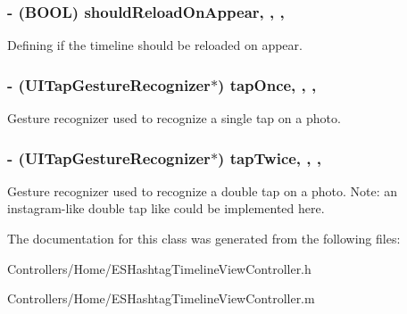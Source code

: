 \subsubsection[{should\+Reload\+On\+Appear}]{\setlength{\rightskip}{0pt plus 5cm}-\/ (B\+O\+O\+L) should\+Reload\+On\+Appear\hspace{0.3cm}{\ttfamily [read]}, {\ttfamily [write]}, {\ttfamily [nonatomic]}, {\ttfamily [assign]}}\label{interface_e_s_hashtag_timeline_view_controller_a333a85f25e01ad6f02cbbe55cb4f7306}
Defining if the timeline should be reloaded on appear. \hypertarget{interface_e_s_hashtag_timeline_view_controller_a02a4ae30a70eeeab88dd6632bc31d2a7}{}
\subsubsection[{tap\+Once}]{\setlength{\rightskip}{0pt plus 5cm}-\/ (U\+I\+Tap\+Gesture\+Recognizer$\ast$) tap\+Once\hspace{0.3cm}{\ttfamily [read]}, {\ttfamily [write]}, {\ttfamily [nonatomic]}, {\ttfamily [strong]}}\label{interface_e_s_hashtag_timeline_view_controller_a02a4ae30a70eeeab88dd6632bc31d2a7}
Gesture recognizer used to recognize a single tap on a photo. \hypertarget{interface_e_s_hashtag_timeline_view_controller_a343813298deb75f763cde6a9a907c212}{}
\subsubsection[{tap\+Twice}]{\setlength{\rightskip}{0pt plus 5cm}-\/ (U\+I\+Tap\+Gesture\+Recognizer$\ast$) tap\+Twice\hspace{0.3cm}{\ttfamily [read]}, {\ttfamily [write]}, {\ttfamily [nonatomic]}, {\ttfamily [strong]}}\label{interface_e_s_hashtag_timeline_view_controller_a343813298deb75f763cde6a9a907c212}
Gesture recognizer used to recognize a double tap on a photo. Note\+: an instagram-\/like double tap like could be implemented here. 

The documentation for this class was generated from the following files\+:\begin{DoxyCompactItemize}
\item 
Controllers/\+Home/E\+S\+Hashtag\+Timeline\+View\+Controller.\+h\item 
Controllers/\+Home/E\+S\+Hashtag\+Timeline\+View\+Controller.\+m\end{DoxyCompactItemize}
